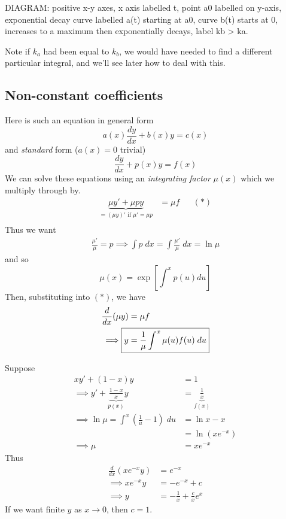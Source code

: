\documentclass{../template/note}
\begin{document}
    DIAGRAM: positive x-y axes, x axis labelled t, point a0 labelled on y-axis, exponential decay curve labelled a(t) starting at a0, curve b(t) starts at 0, increases to a maximum then exponentially decays, label kb > ka.

    Note if \(k_a\) had been equal to \(k_b\), we would have needed to find a different particular integral, and we'll see later how to deal with this.
    
    \subsection{Non-constant coefficients}

    Here is such an equation in general form
    \[  
        a(x)\frac{dy}{dx} + b(x)y = c(x)
    \]
    and \emph{standard} form (\(a(x) = 0\) trivial)
    \[  
        \frac{dy}{dx} + p(x)y = f(x)
    \]
    We can solve these equations using an \emph{integrating factor} \(\mu(x)\) which we multiply through by.
    \begin{align*}
        \underbrace{\mu y' + \mu p y}_{\displaystyle =(\mu y)' \text{ if } \mu' = \mu p} &= \mu f && (*) \\
    \end{align*}
    Thus we want
    \begin{align*}
        \frac{\mu'}{\mu} = p \implies \int p \; dx = \int \frac{\mu'}{\mu} \; dx = \ln \mu
    \end{align*}
    and so
    \[
        \mu(x) = \exp\left[\int^x p(u) du\right]
    \]
    Then, substituting into \((*)\), we have
    \begin{align*}
        \frac{d}{dx}(\mu y) &= \mu f \\
        \implies \Aboxed{y &= \frac{1}{\mu} \int^x \mu(u)f(u) \; du}
    \end{align*}
    
    \begin{example}
        Suppose
        \begin{align*}
            xy' + (1-x)y &= 1 \\
            \implies y' + \underbrace{\frac{1-x}{x}}_{p(x)}y &= \underbrace{\frac{1}{x}}_{f(x)} \\
            \implies \ln \mu = \int^x \left(\frac 1 u - 1\right) \; du &= \ln x - x \\
            &= \ln(xe^{-x}) \\
            \implies \mu &= xe^{-x}
        \end{align*}
        Thus
        \begin{align*}
            \frac{d}{dx}\left(xe^{-x} y\right) &= e^{-x} \\
            \implies xe^{-x}y &= -e^{-x} + c \\
            \implies y &= -\frac 1 x + \frac c x e^x
        \end{align*}
        If we want finite \(y\) as \(x \to 0\), then \(c = 1\).
    \end{example}
\end{document}
